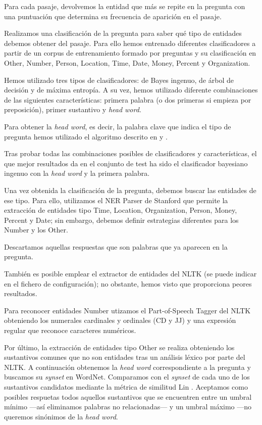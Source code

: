 \documentclass[12pt,a4paper,titlepage]{article}
\newcounter{subsubsubsection}
\begin{document}
Para cada pasaje, devolvemos la entidad que más se repite en la pregunta con una puntuación que determina su frecuencia de aparición en el pasaje.

Realizamos una clasificación de la pregunta para saber qué tipo de entidades debemos obtener del pasaje. Para ello hemos entrenado diferentes clasificadores a partir de un corpus de entrenamiento formado por preguntas y su clasificación en Other, Number, Person, Location, Time, Date, Money, Percent y Organization.

Hemos utilizado tres tipos de clasificadores: de Bayes ingenuo, de árbol de decisión y de máxima entropía. A su vez, hemos utilizado diferente combinaciones de las siguientes características: primera palabra (o dos primeras si empieza por preposición), primer sustantivo y \emph{head word}.

Para obtener la \emph{head word}, es decir, la palabra clave que indica el tipo de pregunta hemos utilizado el algoritmo descrito en \cite{tesis:qc} y \cite{paper:qc}.

Tras probar todas las combinaciones posibles de clasificadores y características, el que mejor resultados da en el conjunto de test ha sido el clasificador bayesiano ingenuo con la \emph{head word} y la primera palabra.

Una vez obtenida la clasificación de la pregunta, debemos buscar las entidades de ese tipo. Para ello, utilizamos el NER Parser de Stanford que permite la extracción de entidades tipo Time, Location, Organization, Person, Money, Percent y Date; sin embargo, debemos definir estrategias diferentes para los Number y los Other.

Descartamos aquellas respuestas que son palabras que ya aparecen en la pregunta.

También es posible emplear el extractor de entidades del NLTK (se puede indicar en el fichero de configuración); no obstante, hemos visto que proporciona peores resultados.

Para reconocer entidades Number utizamos el Part-of-Speech Tagger del NLTK obteniendo los numerales cardinales y ordinales (CD y JJ) y una expresión regular que reconoce caracteres numéricos.

Por último, la extracción de entidades tipo Other se realiza obteniendo los sustantivos comunes que no son entidades tras un análisis léxico por parte del NLTK. A continuación obtenemos la \emph{head word} correspondiente a la pregunta y buscamos su \emph{synset} en WordNet. Comparamos con el \emph{synset} de cada uno de los sustantivos candidatos mediante la métrica de similitud Lin \cite{wn1} \cite{wn2} \cite{wn3}. Aceptamos como posibles respuetas todos aquellos sustantivos que se encuentren entre un umbral mínimo ---así eliminamos palabras no relacionadas--- y un umbral máximo ---no queremos sinónimos de la \emph{head word}.
\end{document}
